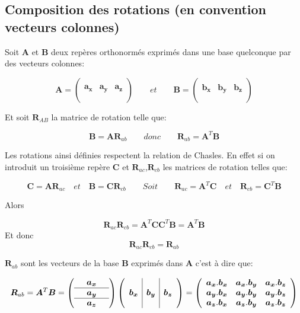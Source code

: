 \documentclass[12pt,a4paper]{article}
\begin{document}
	\newpage
	\subsection{Composition des rotations (en convention vecteurs colonnes)}
	
	Soit $\bm{A}$ et $\bm{B}$ deux repères orthonormés exprimés dans une base quelconque par des vecteurs colonnes:
	
	\[
		\bm{A}=\left(\begin{array}{c|c|c}
		&&\\
		\bm{a_x}&\bm{a_y}&\bm{a_z}\\
		&&\\
		\end{array}
		\right)		
		\qquad 
		et
		\qquad
		\bm{B}=\left(\begin{array}{c|c|c}
		&&\\
		\bm{b_x}&\bm{b_y}&\bm{b_z}\\
		&&\\
		\end{array}
		\right)
	\]
	
	
	Et soit $\bm{R}_{AB}$ la matrice de rotation telle que:
	
	\[
	\boxed{\bm{B}=\bm{A} \bm{R}_{ab}} \quad \quad donc \quad \quad \boxed{\bm{R}_{ab}=\bm{A}^T\bm{B}}
	\]
	
	Les rotations ainsi définies respectent la relation de Chasles. En effet si on introduit un troisième repère $\bm{C}$ et $\bm{R}_{ac}$,$\bm{R}_{cb}$ les matrices de rotation telles que:
	
	\[
	\bm{C}=\bm{A} \bm{R}_{ac}\quad et \quad \bm{B}=\bm{C} \bm{R}_{cb}  \quad\quad Soit\quad \quad \bm{R}_{ac}=\bm{A}^T\bm{C} \quad et\quad  \bm{R}_{cb}=\bm{C}^T\bm{B}
	\]
	
	Alors 
	
	\[
	\bm{R}_{ac}\bm{R}_{cb}=\bm{A}^T\bm{C} \bm{C}^T\bm{B} = \bm{A}^T\bm{B}
	\]
	Et donc 
	\[
	\boxed{\bm{R}_{ac}\bm{R}_{cb}=\bm{R}_{ab}}
	\]
	
	$\bm{R}_{ab}$ sont les vecteurs de la base $\bm{B}$ exprimés dans $\bm{A}$ c'est à dire que:
	
	\[
		\bm{R}_{ab}=\bm{A}^T\bm{B}=
		\left(\begin{array}{ccc}
		&\bm{a_x}&\\
		\hline
		&\bm{a_y}&\\
		\hline
		&\bm{a_z}&\\
		\end{array}
		\right)
		\left(\begin{array}{c|c|c}
		&&\\
		\bm{b_x}&\bm{b_y}&\bm{b_z}\\
		&&\\
		\end{array}
		\right)
		=
		\left(\begin{array}{ccc}
		\bm{a_x}.\bm{b_x}&\bm{a_x}.\bm{b_y}&\bm{a_x}.\bm{b_z}\\
		\bm{a_y}.\bm{b_x}&\bm{a_y}.\bm{b_y}&\bm{a_y}.\bm{b_z}\\
		\bm{a_z}.\bm{b_x}&\bm{a_z}.\bm{b_y}&\bm{a_z}.\bm{b_z}\\
		\end{array}
		\right)
	\]
	
\end{document}
